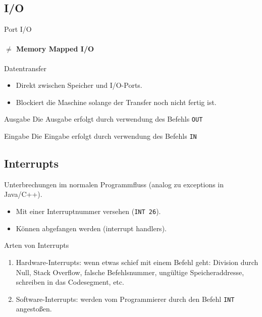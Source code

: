 \subsection{I/O}

\begin{frame}{Port I/O}
\framesubtitle{$\neq$ Memory Mapped I/O}
 \begin{center}
  
 \end{center}
\end{frame}


\begin{frame}{Datentransfer}
 \begin{itemize}
   \item Direkt zwischen Speicher und I/O-Ports.
   \item Blockiert die Maschine solange der Transfer noch nicht fertig ist.
 \end{itemize}
\end{frame}


\begin{frame}{Ausgabe}
 Die Ausgabe erfolgt durch verwendung des Befehls \texttt{OUT}
 \begin{center}
  
 \end{center}
\end{frame}


\begin{frame}{Eingabe}
 Die Eingabe erfolgt durch verwendung des Befehls \texttt{IN}
 \begin{center}
  
 \end{center}
\end{frame}


\subsection{Interrupts}

\begin{frame}{\insertsubsection}
 Unterbrechungen im normalen Programmfluss
 (analog zu \glqq exceptions\grqq{} in Java/C++).
 \begin{itemize}
   \item Mit einer Interruptnummer versehen (\texttt{INT 26}).
   \item Können abgefangen werden (interrupt handlers).
 \end{itemize}
\end{frame}



\begin{frame}{Arten von Interrupts}
 \begin{enumerate}
  \item Hardware-Interrupts: wenn etwas schief mit einem Befehl geht:
        Division durch Null, Stack Overflow, falsche Befehlsnummer, ungültige
        Speicheraddresse, schreiben in das Codesegment, etc.
  \item Software-Interrupts: werden vom Programmierer durch den Befehl 
        \texttt{INT} angestoßen.
 \end{enumerate}
\end{frame}


